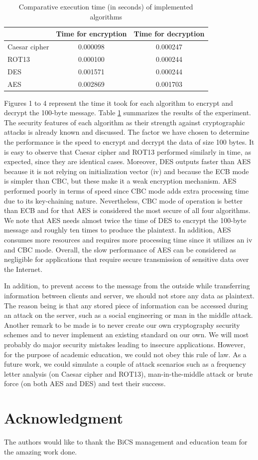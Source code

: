 \begin{table}[h!]
\begin{tabular}{|l|c|c|}
\hline
\multicolumn{1}{|c|}{} & Time for encryption & \multicolumn{1}{l|}{Time for decryption} \\ \hline
Caesar cipher & 0.000098 & 0.000247 \\ \hline
ROT13 & 0.000100 & 0.000244 \\ \hline
DES & 0.001571 & 0.000244 \\ \hline
AES & 0.002869 & 0.001703 \\ \hline
\end{tabular}
\caption{Comparative execution time (in seconds) of implemented algorithms}
\label{results}
\end{table}



Figures 1 to 4 represent the time it took for each algorithm to encrypt and decrypt the 100-byte message. Table \ref{results} summarizes the results of the experiment. The security features of each algorithm as their strength against cryptographic attacks is already known and discussed. The factor we have chosen to determine the performance is the speed to encrypt and decrypt the data of size 100 bytes. It is easy to observe that Caesar cipher and ROT13 performed similarly in time, as expected, since they are identical cases. Moreover, DES outputs faster than AES because it is not relying on initialization vector (iv) and because the ECB mode is simpler than CBC, but these make it a weak encryption mechanism. AES performed poorly in terms of speed since CBC mode adds extra processing time due to its key-chaining nature. Nevertheless, CBC mode of operation is better than ECB and for that AES is considered the most secure of all four algorithms. We note that AES needs almost twice the time of DES to encrypt the 100-byte message and roughly ten times to produce the plaintext. In addition, AES consumes more resources and requires more processing time since it utilizes an iv and CBC mode. Overall, the slow performance of AES can be considered as negligible for applications that require secure transmission of sensitive data over the Internet.

In addition, to prevent access to the message from the outside while transferring information between clients and server, we should not store any data as plaintext. The reason being is that any stored piece of information can be accessed during an attack on the server, such as a social engineering or man in the middle attack. Another remark to be made is to never create our own cryptography security schemes and to never implement an existing standard on our own. We will most probably do major security mistakes leading to insecure applications. However, for the purpose of academic education, we could not obey this rule of law. 
As a future work, we could simulate a couple of attack scenarios such as a frequency letter analysis (on Caesar cipher and ROT13), man-in-the-middle attack or brute force (on both AES and DES) and test their success. 


\section*{Acknowledgment}
The authors would like to thank the BiCS management and education team for the amazing work done.